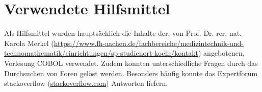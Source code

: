 \chapter{Verwendete Hilfsmittel}\label{ch:verwendete-hilfsmittel}

Als Hilfsmittel wurden hauptsächlich die Inhalte der, von Prof. Dr. rer. nat. Karola Merkel (\url{https://www.fh-aachen.de/fachbereiche/medizintechnik-und-technomathematik/einrichtungen/sp-studienort-koeln/kontakt}) angebotenen, Vorlesung \glqq COBOL\grqq{} verwendet.
Zudem konnten unterschiedliche Fragen durch das Durchsuchen von Foren gelöst werden.
Besonders häufig konnte das \glqq Expertforum \glqq stackoverflow\grqq{} (\url{stackoverflow.com}) Antworten liefern.